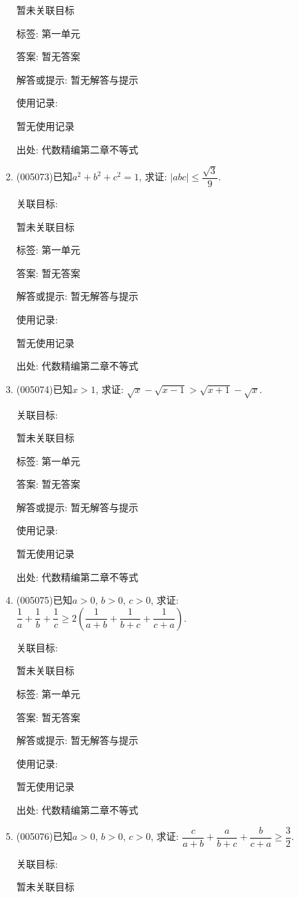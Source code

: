 \documentclass[10pt,a4paper]{article}
\begin{document}
\begin{enumerate}[1.]
暂未关联目标



标签: 第一单元

答案: 暂无答案

解答或提示: 暂无解答与提示

使用记录:

暂无使用记录


出处: 代数精编第二章不等式
\item { (005073)}已知$a^2+b^2+c^2=1$, 求证: $|abc|\le \dfrac{\sqrt 3}9$.


关联目标:

暂未关联目标



标签: 第一单元

答案: 暂无答案

解答或提示: 暂无解答与提示

使用记录:

暂无使用记录


出处: 代数精编第二章不等式
\item { (005074)}已知$x>1$, 求证: $\sqrt x-\sqrt{x-1}>\sqrt{x+1}-\sqrt x$.


关联目标:

暂未关联目标



标签: 第一单元

答案: 暂无答案

解答或提示: 暂无解答与提示

使用记录:

暂无使用记录


出处: 代数精编第二章不等式
\item { (005075)}已知$a>0$, $b>0$, $c>0$, 求证: $\dfrac 1a+\dfrac 1b+\dfrac 1c\ge 2(\dfrac 1{a+b}+\dfrac 1{b+c}+\dfrac 1{c+a})$.


关联目标:

暂未关联目标



标签: 第一单元

答案: 暂无答案

解答或提示: 暂无解答与提示

使用记录:

暂无使用记录


出处: 代数精编第二章不等式
\item { (005076)}已知$a>0$, $b>0$, $c>0$, 求证: $\dfrac c{a+b}+\dfrac a{b+c}+\dfrac b{c+a}\ge \dfrac 32$.


关联目标:

暂未关联目标




\end{enumerate}
\end{document}
